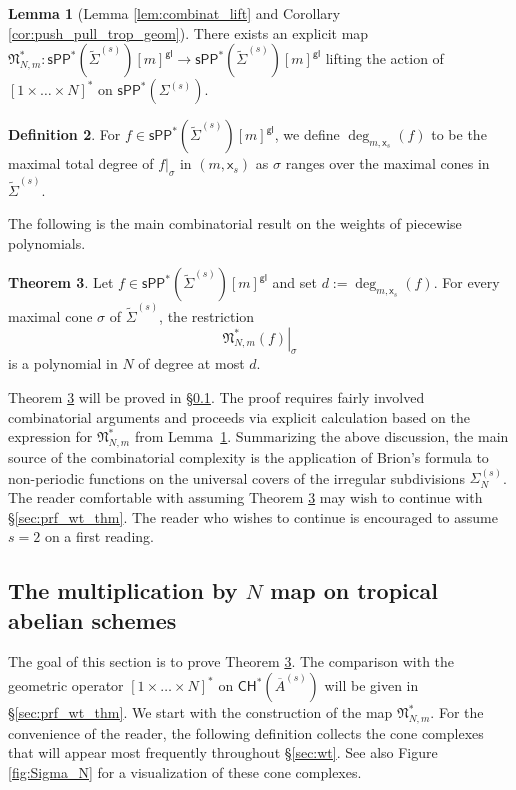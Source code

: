 \documentclass[11pt]{article}
\def\CH{\mathsf{CH}}
\newcommand{\barA}{\overline{A}}
\newcommand{\sPP}{\mathsf{sPP}}
\newcommand{\spp}{\sPP}
\theoremstyle{definition}
\newtheorem{definition}{Definition}[section]
\newtheorem{theorem}[definition]{Theorem}
\newtheorem{lemma}[definition]{Lemma}
\begin{document}
\begin{lemma}[Lemma \ref{lem:combinat_lift} and Corollary \ref{cor:push_pull_trop_geom}]
	\label{lem:exists_explicit_lift}
	There exists an explicit map $\mathfrak{N}_{N,m}^{\ast}:\spp^{\ast}(\tilde{\Sigma}^{(s)})[m]^{\mathsf{gl}}\to \spp^{\ast}(\tilde{\Sigma}^{(s)})[m]^{\mathsf{gl}}$
	lifting the action of $[1\times\dots\times N]^{\ast}$ on $\spp^{\ast}(\Sigma^{(s)})$.
\end{lemma}

\begin{definition}
	For $f\in \spp^{\ast}(\tilde{\Sigma}^{(s)})[m]^{\mathsf{gl}}$, we define $\deg_{m,\mathsf{x}_s}(f)$
	to be the maximal total degree of $f|_{\sigma}$ in $(m,\mathsf{x}_s)$
	as $\sigma$ ranges over the maximal cones in $\tilde{\Sigma}^{(s)}$.
\end{definition}

The following is the main combinatorial result on the weights of piecewise polynomials.

\begin{theorem}
	\label{thm:polynomiality}
	Let $f\in \spp^{\ast}(\tilde{\Sigma}^{(s)})[m]^{\mathsf{gl}}$ and set $d:=\deg_{m,\mathsf{x}_s}(f)$. For every maximal cone
	$\sigma$ of $\tilde{\Sigma}^{(s)}$, the restriction
	$$\left.\mathfrak N_{N,m}^\ast(f)\right|_\sigma$$
	is a polynomial in $N$ of degree at most $d$.
\end{theorem}

Theorem \ref{thm:polynomiality} will be proved in \S \ref{sec:trop}.
The proof requires fairly involved combinatorial arguments and proceeds via explicit calculation based on the expression for $\mathfrak{N}_{N,m}^{\ast}$ from Lemma~\ref{lem:exists_explicit_lift}. Summarizing the above discussion, the main source of the combinatorial complexity is the application of Brion's formula to non-periodic functions on the universal covers of the irregular subdivisions $\Sigma_N^{(s)}$.
The reader comfortable with assuming Theorem \ref{thm:polynomiality} may wish to continue with \S\ref{sec:prf_wt_thm}.
The reader who wishes to continue is encouraged to assume $s=2$ on a first reading.

\subsection{The multiplication by \texorpdfstring{$N$}{N} map on tropical abelian schemes}\label{sec:trop}

The goal of this section is to prove Theorem \ref{thm:polynomiality}.
The comparison with the geometric operator $[1\times\dots \times N]^{\ast}$ on $\CH^{\ast}(\barA^{(s)})$
will be given in \S\ref{sec:prf_wt_thm}. We start with the construction of the map
$\mathfrak N_{N,m}^{\ast}$. For the convenience of the reader, the following definition collects the cone complexes
that will appear most frequently throughout \S\ref{sec:wt}. See also Figure \ref{fig:Sigma_N} for a visualization of these
cone complexes.
\end{document}
